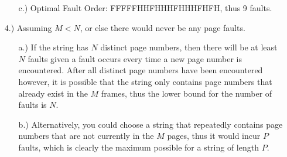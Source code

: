 \documentclass[12pt]{article}
\begin{document}
\begin{itemize}
\begin{itemize}
            \item [c.)] Optimal Fault Order: FFFFFHHFHHHFHHHFHFH, thus 9 faults.
        \end{itemize}

        \item [4.)] Assuming \( M < N \), or else there would never be any page faults.
        \begin{itemize}
            \item [a.)] If the string has \( N \) distinct page numbers, then there will be
                at least \( N \) faults given a fault occurs every time a new page number is
                encountered. After all distinct page numbers have been encountered however, it
                is possible that the string only contains page numbers that already exist in the
                \( M \) frames, thus the lower bound for the number of faults is \( N \).

            \item [b.)] Alternatively, you could choose a string that repeatedly contains page numbers
                that are not currently in the \( M \) pages, thus it would incur \( P \) faults, which
                is clearly the maximum possible for a string of length \( P \).
        \end{itemize}
    \end{itemize}
\end{document}
